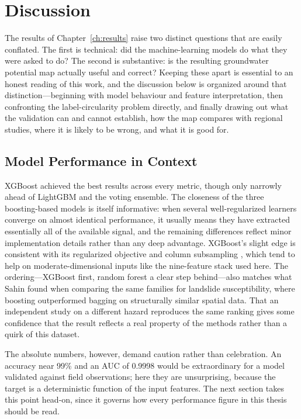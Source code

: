 \chapter{Discussion}
\label{ch:discussion}

The results of Chapter~\ref{ch:results} raise two distinct questions that are
easily conflated. The first is technical: did the machine-learning models do
what they were asked to do? The second is substantive: is the resulting
groundwater potential map actually useful and correct? Keeping these apart is
essential to an honest reading of this work, and the discussion below is
organized around that distinction---beginning with model behaviour and feature
interpretation, then confronting the label-circularity problem directly, and
finally drawing out what the validation can and cannot establish, how the map
compares with regional studies, where it is likely to be wrong, and what it is
good for.

\section{Model Performance in Context}
\label{sec:discuss_performance}

XGBoost achieved the best results across every metric, though only narrowly ahead
of LightGBM and the voting ensemble. The closeness of the three boosting-based
models is itself informative: when several well-regularized learners converge on
almost identical performance, it usually means they have extracted essentially
all of the available signal, and the remaining differences reflect minor
implementation details rather than any deep advantage. XGBoost's slight edge is
consistent with its regularized objective and column subsampling
\cite{chen2016xgboost}, which tend to help on moderate-dimensional inputs like the
nine-feature stack used here. The ordering---XGBoost first, random forest a clear
step behind---also matches what Sahin \cite{sahin2020ensembletree} found when
comparing the same families for landslide susceptibility, where boosting
outperformed bagging on structurally similar spatial data. That an independent
study on a different hazard reproduces the same ranking gives some confidence that
the result reflects a real property of the methods rather than a quirk of this
dataset.

The absolute numbers, however, demand caution rather than celebration. An accuracy
near 99\% and an AUC of 0.9998 would be extraordinary for a model validated
against field observations; here they are unsurprising, because the target is a
deterministic function of the input features. The next section takes this point
head-on, since it governs how every performance figure in this thesis should be
read.

